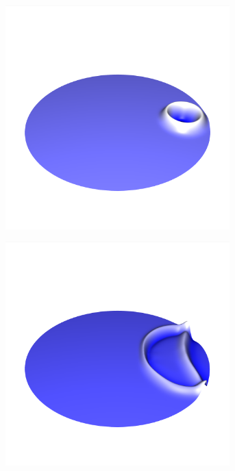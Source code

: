 \documentclass[crop=false,10pt,ngerman]{standalone}
\begin{document}
\begin{figure}[h]
\begin{subfigure}[b]{0.24\textwidth}
          \includegraphics[trim={1.5cm 3.05cm 1.5cm 5.2cm},clip,width=0.95\textwidth]{images/circle_wave_1.png}
          \caption{}
        \end{subfigure}
        \begin{subfigure}[b]{0.24\textwidth}
          \center
          \includegraphics[trim={1.5cm 3.05cm 1.5cm 5.2cm},clip,width=0.95\textwidth]{images/circle_wave_2.png}

\end{subfigure}
\end{figure}
\end{document}
